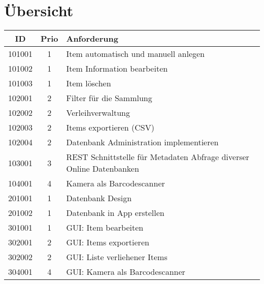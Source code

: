 \section{Übersicht}

\begin{table} [htbp]
	\begin{tabular}{|c|c|l|}
			\rowcolor{black} {\color{white}\textbf{ID}} & {\color{white}\textbf{Prio}} & {\color{white}\textbf{Anforderung}} \\ \hline
				101001 & 1 & Item automatisch und manuell anlegen \\ \hline
				\rowcolor{DarkSeaGreen} 101002 & 1 & Item Information bearbeiten \\ \hline
				101003 & 1 & Item löschen \\ \hline
				\rowcolor{DarkSeaGreen} 102001 & 2 & Filter für die Sammlung \\ \hline
				102002 & 2 & Verleihverwaltung \\ \hline
				\rowcolor{DarkSeaGreen} 102003 & 2 & Items exportieren (CSV) \\ \hline
				102004 & 2 & Datenbank Administration implementieren \\ \hline
				\rowcolor{DarkSeaGreen} 103001 & 3 & REST Schnittstelle für Metadaten Abfrage diverser Online Datenbanken \\ \hline
				104001 & 4 & Kamera als Barcodescanner \\ \hline
				\rowcolor{DarkSeaGreen} 201001 & 1 & Datenbank Design \\ \hline
				201002 & 1 & Datenbank in App erstellen \\ \hline
				\rowcolor{DarkSeaGreen} 301001 & 1 & GUI: Item bearbeiten \\ \hline
				302001 & 2 & GUI: Items exportieren \\ \hline
				\rowcolor{DarkSeaGreen} 302002 & 2 & GUI: Liste verliehener Items \\ \hline
				304001 & 4 & GUI: Kamera als Barcodescanner \\ \hline
	\end{tabular}
\end{table}